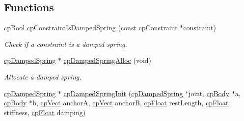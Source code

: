 \subsection*{Functions}
\begin{DoxyCompactItemize}
\item 
\hypertarget{group__cp_damped_spring_gaa0fcb022b33cc27691323f016a3cb178}{}\hyperlink{group__basic_types_gabc5e752c48f3449ca26ef413ecbd647e}{cp\+Bool} \hyperlink{group__cp_damped_spring_gaa0fcb022b33cc27691323f016a3cb178}{cp\+Constraint\+Is\+Damped\+Spring} (const \hyperlink{structcp_constraint}{cp\+Constraint} $\ast$constraint)\label{group__cp_damped_spring_gaa0fcb022b33cc27691323f016a3cb178}

\begin{DoxyCompactList}\small\item\em Check if a constraint is a damped spring. \end{DoxyCompactList}\item 
\hypertarget{group__cp_damped_spring_ga09c3c3729dd0e2b920948afa15cbd9e1}{}\hyperlink{structcp_damped_spring}{cp\+Damped\+Spring} $\ast$ \hyperlink{group__cp_damped_spring_ga09c3c3729dd0e2b920948afa15cbd9e1}{cp\+Damped\+Spring\+Alloc} (void)\label{group__cp_damped_spring_ga09c3c3729dd0e2b920948afa15cbd9e1}

\begin{DoxyCompactList}\small\item\em Allocate a damped spring. \end{DoxyCompactList}\item 
\hypertarget{group__cp_damped_spring_gad26892b940af46dd5be75243bec74bf4}{}\hyperlink{structcp_damped_spring}{cp\+Damped\+Spring} $\ast$ \hyperlink{group__cp_damped_spring_gad26892b940af46dd5be75243bec74bf4}{cp\+Damped\+Spring\+Init} (\hyperlink{structcp_damped_spring}{cp\+Damped\+Spring} $\ast$joint, \hyperlink{structcp_body}{cp\+Body} $\ast$a, \hyperlink{structcp_body}{cp\+Body} $\ast$b, \hyperlink{structcp_vect}{cp\+Vect} anchor\+A, \hyperlink{structcp_vect}{cp\+Vect} anchor\+B, \hyperlink{group__basic_types_gac1ed65573e035bf892505768c852d8d3}{cp\+Float} rest\+Length, \hyperlink{group__basic_types_gac1ed65573e035bf892505768c852d8d3}{cp\+Float} stiffness, \hyperlink{group__basic_types_gac1ed65573e035bf892505768c852d8d3}{cp\+Float} damping)\label{group__cp_damped_spring_gad26892b940af46dd5be75243bec74bf4}


\end{DoxyCompactItemize}

